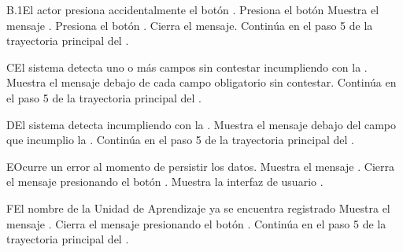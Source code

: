 \begin{UCtrayectoriaA}{B.1}{El actor presiona accidentalmente el botón .}
	\UCpaso[\UCactor] Presiona el botón 
	\UCpaso Muestra el mensaje .
	\UCpaso[\UCactor] Presiona el botón .
	\UCpaso Cierra el mensaje.
	\UCpaso Continúa en el paso 5 de la trayectoria principal del .
\end{UCtrayectoriaA}

\begin{UCtrayectoriaA}{C}{El sistema detecta uno o más campos sin contestar incumpliendo con la .}
	\UCpaso Muestra el mensaje debajo de cada campo obligatorio sin contestar.
	\UCpaso Continúa en el paso 5 de la trayectoria principal del .
\end{UCtrayectoriaA}

\begin{UCtrayectoriaA}{D}{El sistema detecta incumpliendo con la .}
	\UCpaso Muestra el mensaje  debajo del campo que incumplio la .
	\UCpaso Continúa en el paso 5 de la trayectoria principal del .
\end{UCtrayectoriaA}

\begin{UCtrayectoriaA}{E}{Ocurre un error al momento de persistir los datos.}
	\UCpaso Muestra el mensaje .
	\UCpaso[\UCactor] Cierra el mensaje presionando el botón .
	\UCpaso Muestra la interfaz de usuario .
\end{UCtrayectoriaA}


\begin{UCtrayectoriaA}{F}{El nombre de la Unidad de Aprendizaje ya se encuentra registrado}
	\UCpaso Muestra el mensaje .
	\UCpaso[\UCactor] Cierra el mensaje presionando el botón .
	\UCpaso Continúa en el paso 5 de la trayectoria principal del .
\end{UCtrayectoriaA}